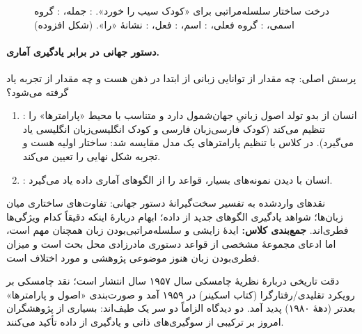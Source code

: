\begin{figure}[!ht]
\centering
{}
\caption{درخت ساختار سلسله‌مراتبی برای «کودک سیب را خورد». : جمله، : گروه اسمی، : گروه فعلی، : اسم، : فعل، : نشانهٔ «را». (شکل افزوده)}
\label{fig:ch02-tree}
\end{figure}

\paragraph{دستور جهانی در برابر یادگیری آماری.} پرسش اصلی: چه مقدار از توانایی زبانی از ابتدا در ذهن هست و چه مقدار از تجربه یاد گرفته می‌شود؟
\begin{enumerate}
  \item {}: انسان از بدو تولد اصول زبانیِ جهان‌شمول دارد و متناسب با محیط «پارامترها» را تنظیم می‌کند (کودک فارسی‌زبان فارسی و کودک انگلیسی‌زبان انگلیسی یاد می‌گیرد). در کلاس با تنظیم پارامترهای یک مدل مقایسه شد: ساختار اولیه هست و تجربه شکل نهایی را تعیین می‌کند.
  \item {}: انسان با دیدن نمونه‌های بسیار، قواعد را از الگوهای آماری داده یاد می‌گیرد.
\end{enumerate}
نقدهای واردشده به تفسیر سخت‌گیرانهٔ دستور جهانی: تفاوت‌های ساختاری میان زبان‌ها؛ شواهد یادگیری الگوهای جدید از داده؛ ابهام دربارهٔ اینکه دقیقاً کدام ویژگی‌ها فطری‌اند. \textbf{جمع‌بندی کلاس:} ایدهٔ زایشی و سلسله‌مراتبی‌بودن زبان همچنان مهم است، اما ادعای مجموعهٔ مشخصی از قواعد دستوری مادرزادی محل بحث است و میزان فطری‌بودن زبان هنوز موضوعی پژوهشی و مورد اختلاف است.

\begin{correctionbox}{دقت تاریخی دربارهٔ نظریهٔ چامسکی}
سال ۱۹۵۷ سال انتشار  است؛ نقد چامسکی بر رویکرد تقلیدی/رفتارگرا (کتاب اسکینر) در ۱۹۵۹ آمد و صورت‌بندی «اصول و پارامترها» بعدتر (دههٔ ۱۹۸۰) پدید آمد. دو دیدگاه الزاماً دو سر یک طیف‌اند: بسیاری از پژوهشگران امروز بر ترکیبی از سوگیری‌های ذاتی و یادگیری از داده تأکید می‌کنند.
\end{correctionbox}

